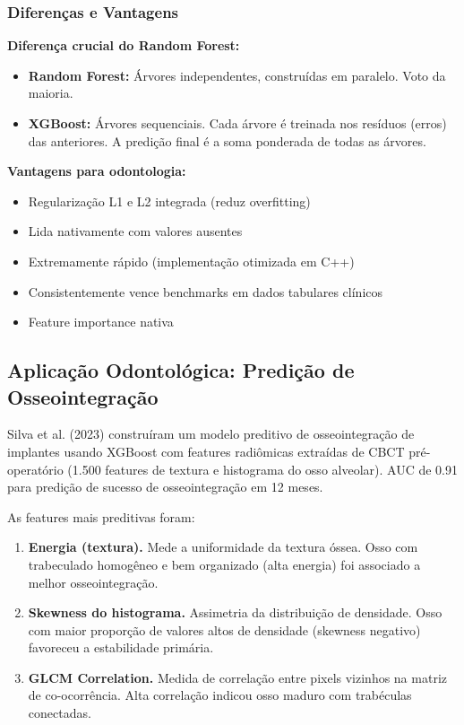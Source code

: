 \subsubsection{Diferenças e Vantagens}

\textbf{Diferença crucial do Random Forest:}
\begin{itemize}
    \item \textbf{Random Forest:} Árvores independentes, construídas em paralelo. Voto da maioria.
    \item \textbf{XGBoost:} Árvores sequenciais. Cada árvore é treinada nos resíduos (erros) das anteriores. A predição final é a soma ponderada de todas as árvores.
\end{itemize}

\textbf{Vantagens para odontologia:}
\begin{itemize}
    \item Regularização L1 e L2 integrada (reduz overfitting)
    \item Lida nativamente com valores ausentes
    \item Extremamente rápido (implementação otimizada em C++)
    \item Consistentemente vence benchmarks em dados tabulares clínicos
    \item Feature importance nativa
\end{itemize}

\subsection{Aplicação Odontológica: Predição de Osseointegração}

Silva et al. (2023) \cite{ODT-056} construíram um modelo preditivo de osseointegração de implantes usando XGBoost com features radiômicas extraídas de CBCT pré-operatório (1.500 features de textura e histograma do osso alveolar). AUC de 0.91 para predição de sucesso de osseointegração em 12 meses.

As features mais preditivas foram:
\begin{enumerate}
    \item \textbf{Energia (textura).} Mede a uniformidade da textura óssea. Osso com trabeculado homogêneo e bem organizado (alta energia) foi associado a melhor osseointegração.
    \item \textbf{Skewness do histograma.} Assimetria da distribuição de densidade. Osso com maior proporção de valores altos de densidade (skewness negativo) favoreceu a estabilidade primária.
    \item \textbf{GLCM Correlation.} Medida de correlação entre pixels vizinhos na matriz de co-ocorrência. Alta correlação indicou osso maduro com trabéculas conectadas.
\end{enumerate}

